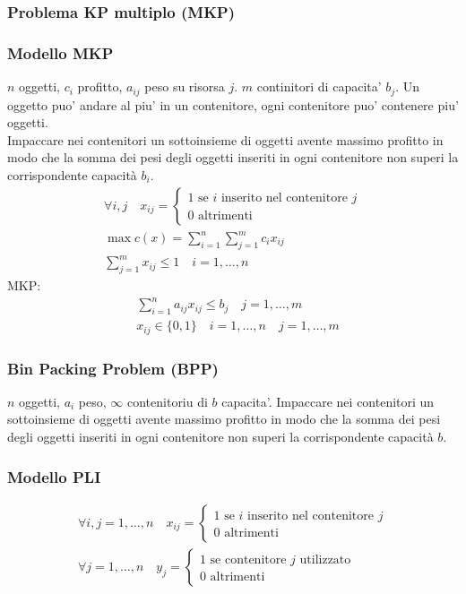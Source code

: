 \documentclass[a4paper,12pt]{article}
\begin{document}
\subsubsection*{Problema KP multiplo (MKP)}
\subsubsection*{Modello MKP}
$n$ oggetti, $c_i$ profitto, $a_{ij}$ peso su risorsa $j$. $m$ continitori di capacita' $b_j$. Un oggetto puo' andare al piu' in un contenitore, ogni contenitore puo' contenere piu' oggetti. \\
Impaccare nei contenitori un sottoinsieme di oggetti avente massimo profitto in modo che la somma dei pesi degli oggetti inseriti in ogni contenitore non superi la corrispondente capacità $b_i$.
\begin{align*}
  \forall i,j \quad x_{ij} = \begin{cases}
    1 \text{ se $i$ inserito nel contenitore $j$}\\
    0 \text{ altrimenti}
  \end{cases}\\
  \max c(x) = \sum_{i=1}^n \sum_{j=1}^m c_i x_{ij}\\
  \sum_{j=1}^m x_{ij} \leq 1 \quad i=1,\dots,n
\end{align*}
MKP:
\begin{align*}
  & \sum_{i=1}^n a_{ij} x_{ij} \leq b_j \quad j=1,\dots,m\\
  & x_{ij} \in \{0,1\} \quad i=1,\dots,n \quad j=1,\dots,m
\end{align*}
\subsubsection{Bin Packing Problem (BPP)}
$n$ oggetti, $a_i$ peso, $\infty$ contenitoriu di $b$ capacita'. Impaccare nei contenitori un sottoinsieme di oggetti avente massimo profitto in modo che la somma dei pesi degli oggetti inseriti in ogni contenitore non superi la corrispondente capacità $b$.\\
\subsubsection*{Modello PLI}
\begin{align*}
  \forall i,j=1,\dots,n \quad x_{ij} = \begin{cases}
    1 \text{ se $i$ inserito nel contenitore $j$}\\
    0 \text{ altrimenti}
  \end{cases}\\
  \forall j=1,\dots,n \quad y_j = \begin{cases}
    1 \text{ se contenitore $j$ utilizzato}\\
    0 \text{ altrimenti}
  \end{cases}
\end{align*}
\end{document}
